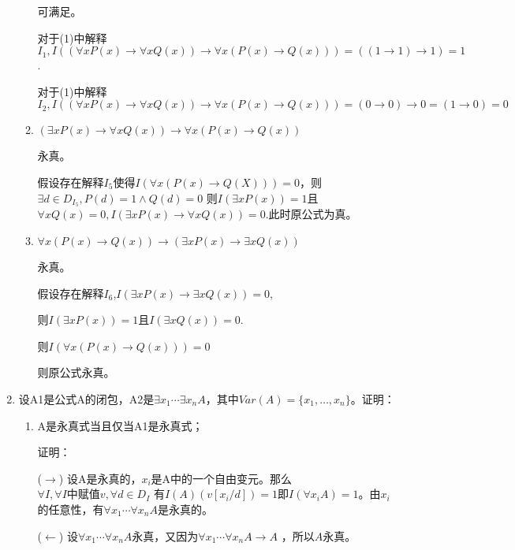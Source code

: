 \documentclass[UTF8]{ctexart}
\begin{document}
\begin{enumerate}
\begin{enumerate}
            可满足。

            对于(1)中解释$I_1,I((\forall xP(x)\rightarrow \forall xQ(x))\rightarrow \forall x(P(x)\rightarrow Q(x)))=((1\rightarrow 1)\rightarrow 1)=1$.

            对于(1)中解释$I_2,I((\forall xP(x)\rightarrow \forall xQ(x))\rightarrow \forall x(P(x)\rightarrow Q(x)))=(0\rightarrow 0)\rightarrow 0=(1\rightarrow 0)=0$


            \item $ (\exists xP(x)\rightarrow \forall xQ(x))\rightarrow \forall x(P(x)\rightarrow Q(x))$
            
            永真。

            假设存在解释$I_5$使得$I(\forall x(P(x)\rightarrow Q(X)))=0$，则$\exists d\in D_{I_5},P(d)=1\wedge Q(d)=0$
            则$I(\exists x P(x))=1$且$\forall xQ(x)=0,I(\exists x P(x)\rightarrow \forall xQ(x))=0$.此时原公式为真。

            \item $ \forall x(P(x)\rightarrow Q(x))\rightarrow (\exists xP(x)\rightarrow \exists xQ(x))$
            
            永真。

            假设存在解释$I_6$,$I(\exists xP(x)\rightarrow \exists xQ(x))=0$,
            
            则$I(\exists xP(x))=1$且$I(\exists xQ(x))=0$.
            
            则$I(\forall x(P(x)\rightarrow Q(x)))=0$
            
            则原公式永真。
        \end{enumerate}

        \item 设A1是公式A的闭包，A2是$\exists x_1 \cdots \exists x_nA$，其中$Var(A)=\{x_1,…,x_n\}$。证明：
        \begin{enumerate}
            \item A是永真式当且仅当A1是永真式；
            
            证明：

            ($\rightarrow$) 设A是永真的，$x_i$是A中的一个自由变元。那么$\forall I,\forall \text{$I$中赋值}v,\forall d\in D_I$
            有$I(A)(v[x_i/d])=1$即$I(\forall x_i A)=1$。由$x_i$的任意性，有$\forall x_1 \cdots \forall x_n A$是永真的。
            
            
            ($\leftarrow$) 设$\forall x_1 \cdots \forall x_n A$永真，又因为$\forall x_1 \cdots \forall x_n A\rightarrow A$
            ，所以$A$永真。


\end{enumerate}
\end{enumerate}
\end{document}
